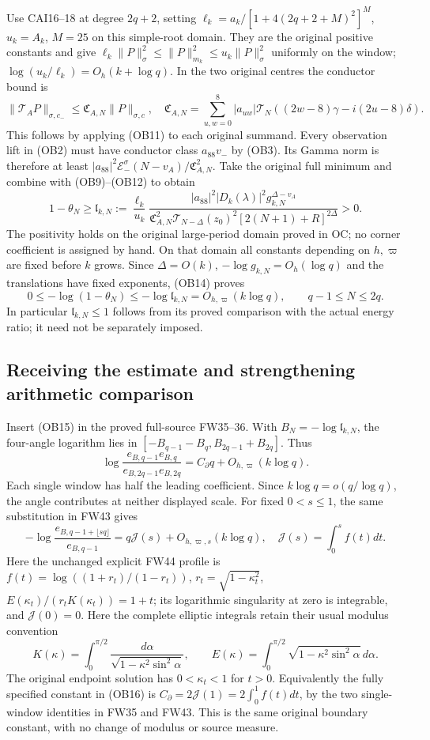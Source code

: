Use CAI16--18 at degree $2q+2$, setting
$\ell_k=a_k/[1+4(2q+2+M)^2]^M$, $u_k=A_k$, $M=25$ on this
simple-root domain. They are the original positive constants and give
$\ell_k\|P\|_\sigma^2\le\|P\|_{m_k}^2\le u_k\|P\|_\sigma^2$
uniformly on the window; $\log(u_k/\ell_k)=O_h(k+\log q)$.
In the two original centres the conductor bound is
\[
 \|\mathcal T_AP\|_{\sigma,c_-}\le\mathfrak C_{A,N}\|P\|_{\sigma,c},
 \quad\mathfrak C_{A,N}=\sum_{u,w=0}^8|a_{uw}|
 \mathcal T_N((2w-8)\gamma-i(2u-8)\delta).\tag{OB13}
\]
This follows by applying (OB11) to each original summand. Every
observation lift in (OB2) must have conductor class $a_{88}v_-$
by (OB3). Its Gamma norm is therefore at least
$|a_{88}|^2\mathcal E_-^\sigma(N-v_A)/\mathfrak C_{A,N}^2$.
Take the original full minimum and combine with (OB9)--(OB12) to obtain
\[
 1-\theta_N\ge\mathfrak l_{k,N}:=
 \frac{\ell_k}{u_k}
 \frac{|a_{88}|^2|D_k(\lambda)|^2g_{k,N}^{\Delta-v_A}}
 {\mathfrak C_{A,N}^2\mathcal T_{N-\Delta}(z_0)^2
 [2(N+1)+R]^{2\Delta}}>0.\tag{OB14}
\]
The positivity holds on the original large-period domain proved in OC;
no corner coefficient is assigned by hand. On that domain all constants
depending on $h,\varpi$ are fixed before $k$ grows. Since
$\Delta=O(k)$, $-\log g_{k,N}=O_h(\log q)$ and the translations
have fixed exponents, (OB14) proves
\[
 0\le-\log(1-\theta_N)\le-\log\mathfrak l_{k,N}
 =O_{h,\varpi}(k\log q),\qquad q-1\le N\le2q.\tag{OB15}
\]
In particular $\mathfrak l_{k,N}\le1$ follows from its proved comparison
with the actual energy ratio; it need not be separately imposed.

\subsection{Receiving the estimate and strengthening arithmetic comparison}
Insert (OB15) in the proved full-source FW35--36. With
$B_N=-\log\mathfrak l_{k,N}$, the four-angle logarithm lies in
$[-B_{q-1}-B_q,B_{2q-1}+B_{2q}]$. Thus
\[
 \log\frac{e_{B,q-1}e_{B,q}}{e_{B,2q-1}e_{B,2q}}
 =C_\partial q+O_{h,\varpi}(k\log q).\tag{OB16}
\]
Each single window has half the leading coefficient. Since
$k\log q=o(q/\log q)$, the angle contributes at neither displayed
scale. For fixed $0<s\le1$, the same substitution in FW43 gives
\[
 -\log\frac{e_{B,q-1+\lfloor sq\rfloor}}{e_{B,q-1}}
 =q\mathcal J(s)+O_{h,\varpi,s}(k\log q),\quad
 \mathcal J(s)=\int_0^sf(t)dt.\tag{OB17}
\]
Here the unchanged explicit FW44 profile is
$f(t)=\log((1+r_t)/(1-r_t))$,
$r_t=\sqrt{1-\kappa_t^2}$,
$E(\kappa_t)/(r_tK(\kappa_t))=1+t$; its logarithmic singularity
at zero is integrable, and $\mathcal J(0)=0$.
Here the complete elliptic integrals retain their usual modulus
convention
\[
 K(\kappa)=\int_0^{\pi/2}\frac{d\alpha}{\sqrt{1-\kappa^2\sin^2\alpha}},
 \qquad E(\kappa)=\int_0^{\pi/2}\sqrt{1-\kappa^2\sin^2\alpha}\,d\alpha.
\]
The original endpoint solution has $0<\kappa_t<1$ for $t>0$.
Equivalently the fully specified constant in (OB16) is
$C_\partial=2\mathcal J(1)=2\int_0^1f(t)dt$, by the two
single-window identities in FW35 and FW43. This is the same original
boundary constant, with no change of modulus or source measure.

